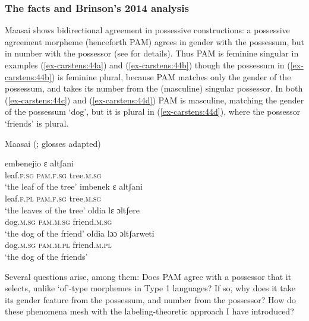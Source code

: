 \documentclass[output=paper
,modfonts
,nonflat]{langsci/langscibook}
\begin{document}
\subsubsection{The facts and Brinson's 2014 analysis} \label{sec-carstens:6.2.1}
Maasai shows bidirectional agreement in possessive constructions: a possessive agreement morpheme (henceforth PAM) agrees in gender with the possessum, but in number with the possessor (see \citealt{Storto2003,Brinson2014} for details). Thus PAM is feminine singular in examples (\ref{ex-carstens:44a}) and (\ref{ex-carstens:44b}) though the possessum in (\ref{ex-carstens:44b}) is feminine plural, because PAM matches only the gender of the possessum, and takes its number from the (masculine) singular possessor. In both (\ref{ex-carstens:44c}) and (\ref{ex-carstens:44d}) PAM  is masculine, matching the gender of the possessum `dog', but it is plural in (\ref{ex-carstens:44d}), where the possessor `friends' is plural.

\begin{exe}
	\ex  Maasai (\citealt{Brinson2014}; glosses adapted)\label{ex-carstens:44}
	{\multicolsep=0pt\begin{multicols}{2}\xlist
	\ex \label{ex-carstens:44a}
	\gll embenejio   ɛ         altʃani\\
	leaf.\textsc{f.sg}      \textsc{pam.f.sg}  tree.\textsc{m.sg}\\
	\glt `the leaf of the tree'  	
	\ex \label{ex-carstens:44b}
	\gll imbenek     ɛ         altʃani\\
	leaf.\textsc{f.pl}      \textsc{pam.f.sg}  tree.\textsc{m.sg}\\
	\glt `the leaves of the tree'
	\ex \label{ex-carstens:44c}
	\gll  oldia     lɛ           ɔltʃere\\
	dog.\textsc{m.sg}  \textsc{pam.m.sg}    friend.\textsc{m.sg}\\
	\glt `the dog of the friend'
	\ex \label{ex-carstens:44d}
	\gll  oldia    lɔɔ         ɔltʃarweti\\
	dog.\textsc{m.sg}  \textsc{pam.m.pl}    friend.\textsc{m.pl}\\
	\glt `the dog of the friends'
	\endxlist\end{multicols}}
\end{exe}
Several questions arise, among them: Does PAM agree with a possessor that it selects, unlike ‘of’-type morphemes in Type 1 languages? If so, why does it take its gender feature from the possessum, and number from the possessor? How do these phenomena mesh with the labeling-theoretic approach I have introduced? 
\end{document}
